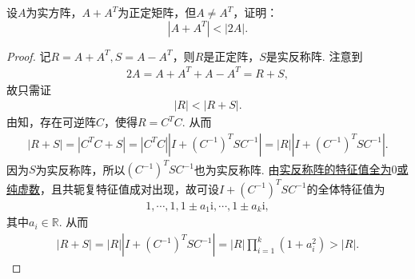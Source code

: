 \documentclass[../../main.tex]{subfiles}
\begin{document}
\begin{example}
设$A$为实方阵，$A + A^T$为正定矩阵，但$A \ne A^T$，证明：
$$|A + A^T| < |2A|.$$
\end{example}
\begin{proof}
记$R=A+A^T,S=A-A^T$，则$R$是正定阵，$S$是实反称阵. 注意到
\begin{align*}
2A=A+A^T+A-A^T=R+S,
\end{align*}
故只需证
\begin{align*}
|R|<|R+S|.
\end{align*}
由知，存在可逆阵$C$，使得$R=C^TC$. 从而
\begin{align*}
|R+S|=|C^TC+S|=|C^TC||I+(C^{-1})^TSC^{-1}|=|R||I+(C^{-1})^TSC^{-1}|.
\end{align*}
因为$S$为实反称阵，所以$(C^{-1})^TSC^{-1}$也为实反称阵. 由\hyperref[proposition:实对称(反称)阵的特征值]{实反称阵的特征值全为$0$或纯虚数}，且共轭复特征值成对出现，故可设$I+(C^{-1})^TSC^{-1}$的全体特征值为
\begin{align*}
1,\cdots,1,1\pm a_1\mathrm{i},\cdots,1\pm a_k\mathrm{i},
\end{align*}
其中$a_i\in\mathbb{R}$. 从而
\begin{align*}
|R+S|=|R||I+(C^{-1})^TSC^{-1}|=|R|\prod_{i=1}^k(1+a_i^2)>|R|.
\end{align*}

\end{proof}
\end{document}
